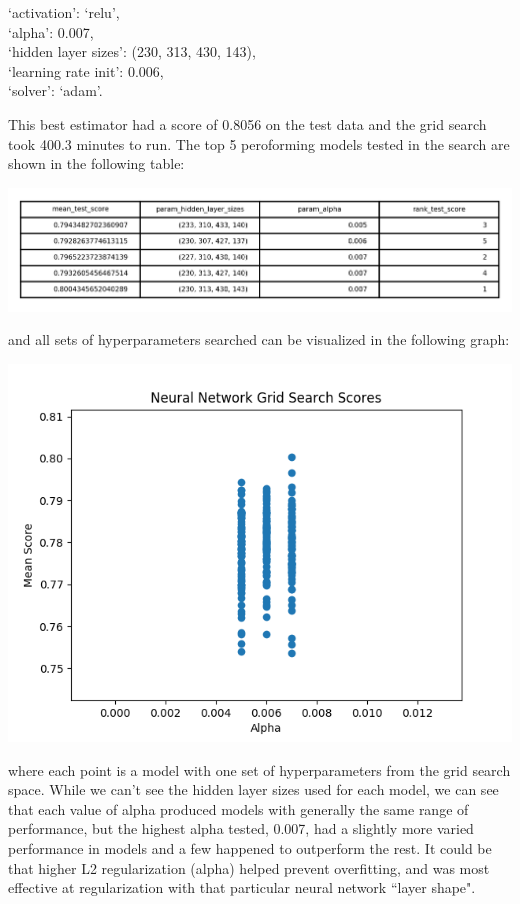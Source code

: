 \documentclass{article}
\begin{document}
\begin{center}
`activation': `relu',
\\`alpha': 0.007,
\\`hidden layer sizes': (230, 313, 430, 143),
\\`learning rate init': 0.006,
\\`solver': `adam'. 
\end{center}
This best estimator had a score of 0.8056 on the test data and the grid search took 400.3 minutes to run. The top 5 peroforming models tested in the search are shown in the following table:
\begin{center}
\includegraphics[scale=1.3]{NeuralNetGridSearchTable.png}
\end{center}
and all sets of hyperparameters searched can be visualized in the following graph:
\begin{center}
\includegraphics[scale=.7]{NNGridSearch.png}
\end{center}
where each point is a model with one set of hyperparameters from the grid search space. While we can't see the hidden layer sizes used for each model, we can see that each value of alpha produced models with generally the same range of performance, but the highest alpha tested, 0.007, had a slightly more varied performance in models and a few happened to outperform the rest. It could be that higher L2 regularization (alpha) helped prevent overfitting, and was most effective at regularization with that particular neural network ``layer shape".
\end{document}
